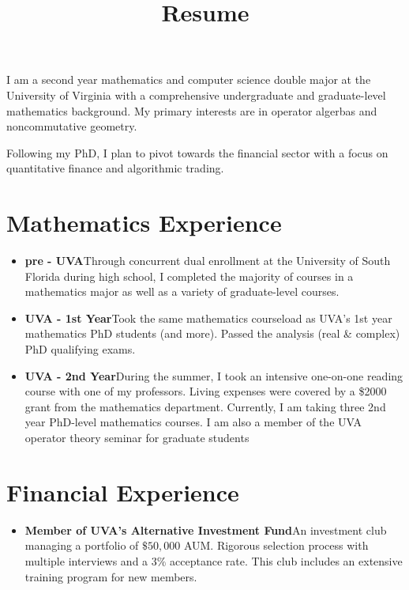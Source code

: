 \documentclass[12pt,letterpaper,sans]{moderncv}
\title{Resume}
\begin{document}
\makecvtitle %
\vspace*{-1.5em}


\begin{center}
  I am a second year mathematics and computer science double major at the University of Virginia with a comprehensive undergraduate and graduate-level mathematics background. My primary interests are in operator algerbas and noncommutative geometry.

\vspace{1.0em}
  Following my PhD, I plan to pivot towards the financial sector with a focus on quantitative finance and algorithmic trading.
\end{center}

\section{Mathematics Experience}

\begin{itemize}
  \item \textbf{pre - UVA}\quad Through concurrent dual enrollment at the University of South Florida during high school, I completed the majority of courses in a mathematics major as well as a variety of graduate-level courses.
  \item \textbf{UVA - 1st Year}\quad Took the same mathematics courseload as UVA's 1st year mathematics PhD students (and more). Passed the analysis (real \& complex) PhD qualifying exams.
  \item \textbf{UVA - 2nd Year}\quad During the summer, I took an intensive one-on-one reading course with one of my professors. Living expenses were covered by a \$2000 grant from the mathematics department. Currently, I am taking three 2nd year PhD-level mathematics courses. I am also a member of the UVA operator theory seminar for graduate students
\end{itemize}

\section{Financial Experience}
\begin{itemize}
  \item \textbf{Member of UVA's Alternative Investment Fund}\quad An investment club managing a portfolio of $ \$50,000 $ AUM. Rigorous selection process with multiple interviews and a $ 3\% $ acceptance rate. This club includes an extensive training program for new members. 
\end{itemize}
\end{document}
